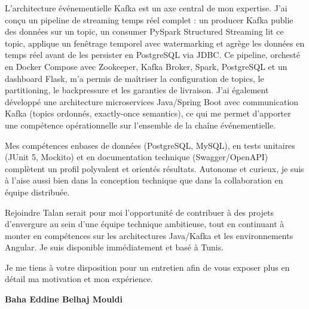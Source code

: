 \documentclass[a4paper,11pt]{article}
\begin{document}
L'architecture événementielle Kafka est un axe central de mon expertise. J'ai conçu un pipeline de streaming temps réel complet : un producer Kafka publie des données sur un topic, un consumer PySpark Structured Streaming lit ce topic, applique un fenêtrage temporel avec watermarking et agrège les données en temps réel avant de les persister en PostgreSQL via JDBC. Ce pipeline, orchesté en Docker Compose avec Zookeeper, Kafka Broker, Spark, PostgreSQL et un dashboard Flask, m'a permis de maîtriser la configuration de topics, le partitioning, le backpressure et les garanties de livraison. J'ai également développé une architecture microservices Java/Spring Boot avec communication Kafka (topics ordonnés, exactly-once semantics), ce qui me permet d'apporter une compétence opérationnelle sur l'ensemble de la chaîne événementielle.

Mes compétences enbases de données (PostgreSQL, MySQL), en tests unitaires (JUnit 5, Mockito) et en documentation technique (Swagger/OpenAPI) complètent un profil polyvalent et orientés résultats. Autonome et curieux, je suis à l'aise aussi bien dans la conception technique que dans la collaboration en équipe distribuée.

Rejoindre Talan serait pour moi l'opportunité de contribuer à des projets d'envergure au sein d'une équipe technique ambitieuse, tout en continuant à monter en compétences sur les architectures Java/Kafka et les environnements Angular. Je suis disponible immédiatement et basé à Tunis.

Je me tiens à votre disposition pour un entretien afin de vous exposer plus en détail ma motivation et mon expérience.

\vspace{0.8cm}

\begin{flushright}
{\bfseries Baha Eddine Belhaj Mouldi}
\end{flushright}
\end{document}
